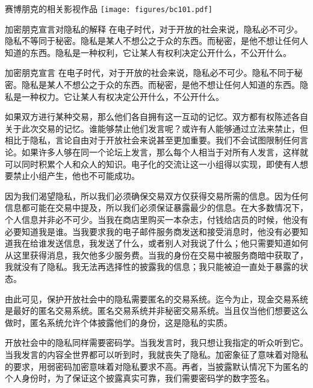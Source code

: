 \documentclass[11pt]{beamer}
\begin{document}
\begin{frame}{赛博朋克的相关影视作品}
	\centering
	\texttt{[image: figures/bc101.pdf]}
\end{frame}

\begin{frame}{加密朋克宣言对隐私的解释}
	在电子时代，对于开放的社会来说，隐私必不可少。隐私不等同于秘密。隐私是某人不想公之于众的东西。而秘密，是他不想让任何人知道的东西。{\color{red}隐私是一种权利}，它让某人有权利决定公开什么，不公开什么。
	
	\hfill
	
\end{frame}

\begin{frame}[allowframebreaks]{加密朋克宣言}
	\footnotesize
	在电子时代，对于开放的社会来说，隐私必不可少。隐私不同于秘密。隐私是某人不想公之于众的东西。而秘密，是他不想让任何人知道的东西。{\color{red}隐私是一种权力}。它让某人有权决定公开什么，不公开什么。
	
	如果双方进行某种交易，那么他们各自拥有这一互动的记忆。双方都有权陈述各自关于此次交易的记忆。谁能够禁止他们发言呢？或许有人能够通过立法来禁止，但相比于隐私，言论自由对于开放社会来说甚至更加重要。我们不会试图限制任何言论。如果许多人够在同一个论坛上发言，那么每个人相当于对所有人发言，这样就可以同时积累个人和众人的知识。电子化的交流让这一小组得以实现，即使有人想要禁止小组产生，他也不可能成功。
	
	因为我们渴望隐私，所以我们必须确保交易双方仅获得交易所需的信息。因为任何信息都可能在交易中提及，所以我们必须保证暴露最少的信息。在大多数情况下，个人信息并非必不可少。当我在商店里购买一本杂志，付钱给店员的时候，他没有必要知道我是谁。当我要求我的电子邮件服务商发送和接受消息时，他没有必要知道我在给谁发送信息，我发送了什么，或者别人对我说了什么；他只需要知道如何从这里获得消息，我欠他多少服务费。当我的身份在交易中被服务商暗中获取了，我就没有了隐私。我无法再选择性的披露我的信息；我只能被迫一直处于暴露的状态。
	
	由此可见，{\color{red}保护开放社会中的隐私需要匿名的交易系统}。迄今为止，现金交易系统是最好的匿名交易系统。匿名交易系统并非秘密交易系统。当且仅当他们想要这么做时，匿名系统允许个体披露他们的身份，这是隐私的实质。
	
	开放社会中的隐私同样需要密码学。当我发言时，我只想让我指定的听众听到它。当我发言的内容全世界都可以听到时，我就丧失了隐私。加密象征了意味着对隐私的要求，用弱密码加密意味着对隐私要求不高。再者，当披露默认情况下为匿名的个人身份时，为了保证这个披露真实可靠，我们需要{\color{red}密码学的数字签名}。
	

\end{frame}
\end{document}
